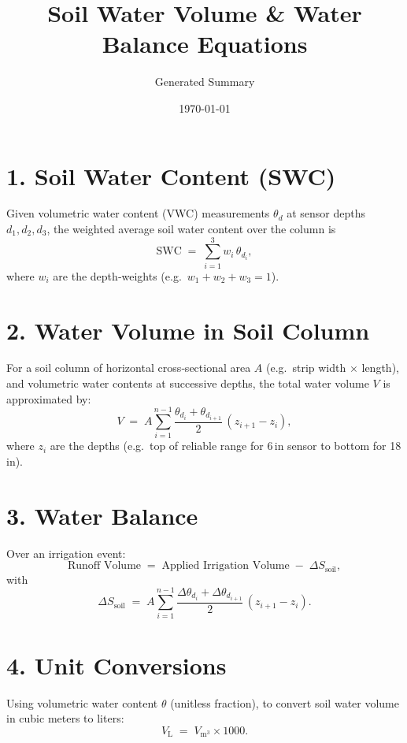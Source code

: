 \documentclass{article}
\title{Soil Water Volume \& Water Balance Equations}
\author{Generated Summary}
\date{\today}
\begin{document}
\maketitle

\section*{1. Soil Water Content (SWC)}
Given volumetric water content (VWC) measurements $\theta_d$ at sensor depths $d_1, d_2, d_3$,
the weighted average soil water content over the column is
\[
\mathrm{SWC} \;=\; \sum_{i=1}^{3} w_i \,\theta_{d_i},
\]
where $w_i$ are the depth‐weights (e.g.\ $w_1 + w_2 + w_3 = 1$).

\section*{2. Water Volume in Soil Column}
For a soil column of horizontal cross‐sectional area $A$ (e.g.\ strip width $\times$ length),
and volumetric water contents at successive depths, the total water volume $V$ is approximated by:
\[
V \;=\; A \sum_{i=1}^{n-1} \frac{\theta_{d_i} + \theta_{d_{i+1}}}{2}\,(z_{i+1} - z_i),
\]
where $z_i$ are the depths (e.g.\ top of reliable range for 6\,in sensor to bottom for 18\,in).

\section*{3. Water Balance}
Over an irrigation event:
\[
\text{Runoff Volume}
\;=\;
\text{Applied Irrigation Volume}
\;-\;
\Delta S_{\text{soil}},
\]
with
\[
\Delta S_{\text{soil}}
\;=\;
A \sum_{i=1}^{n-1} \frac{\Delta \theta_{d_i} + \Delta \theta_{d_{i+1}}}{2}\,(z_{i+1} - z_i).
\]

\section*{4. Unit Conversions}
Using volumetric water content $\theta$ (unitless fraction),
to convert soil water volume in cubic meters to liters:
\[
V_{\mathrm{L}} \;=\; V_{\mathrm{m^3}} \times 1000.
\]
\end{document}
